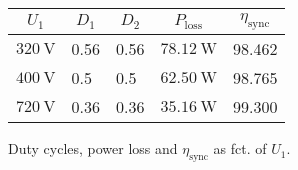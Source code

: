 
\begin{solutiontable}[ht]
    \centering  %
    \begin{tabular}{lllll}
        \toprule
        \multicolumn{1}{c}{$U_\mathrm{1}$} & \multicolumn{1}{c}{$D_1$} & 
        \multicolumn{1}{c}{$D_2$} & \multicolumn{1}{c}{$P_\mathrm{loss}$} &  
        \multicolumn{1}{c}{$\eta_\mathrm{sync}$} \\
        \midrule 
        $\SI{320}{\volt}$ & 0.56 &  0.56  & $\SI{78.12}{\watt}$ & 98.462 \\ 
        $\SI{400}{\volt}$ & 0.5  &  0.5   & $\SI{62.50}{\watt}$ & 98.765 \\ 
        $\SI{720}{\volt}$ & 0.36 &  0.36  & $\SI{35.16}{\watt}$ & 99.300 \\ 
        \bottomrule
    \end{tabular}
    \caption{Duty cycles, power loss and $\eta_\mathrm{sync}$ as fct. of $U_\mathrm{1}$.}
    \label{table:PowerlossDutyCycleEfficiencySync}
\end{solutiontable}
